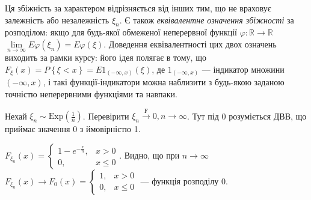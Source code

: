 \begin{enumerate}
    Ця збіжність за характером відрізняється від інших тим, що не враховує залежність або незалежність $\xi_n$.
    Є також \emph{еквівалентне означення збіжності} за розподілом: якщо для будь-якої обмеженої неперервної функції $\varphi : \mathbb{R} \to \mathbb{R}$
    $\underset{n \to \infty}{\lim} E \varphi(\xi_n) = E\varphi(\xi)$.
    Доведення еквівалентності цих двох означень виходить за рамки курсу: його ідея полягає в тому, що $F_{\xi}(x) = P\left\{ \xi < x\right\} = E 1_{(-\infty, x)}(\xi)$,
    де $1_{(-\infty, x)}$ --- індикатор множини $(-\infty, x)$, і такі функції-індикатори можна наблизити з будь-якою заданою точністю неперервними функціями та навпаки.
    \begin{example}
        Нехай $\xi_n \sim \mathrm{Exp}(\frac{1}{n})$. Перевірити $\xi_n \overset{\mathrm{F}}{\to} 0, n \to \infty$.
        Тут під 0 розуміється ДВВ, що приймає значення 0 з ймовірністю 1.

        $F_{\xi_n}(x) = \begin{cases}
            1 - e^{-\frac{x}{n}}, & x > 0 \\
            0, & x \leq 0
        \end{cases}$. Видно, що при $n \to \infty$ $F_{\xi_n}(x) \to F_0(x) = \begin{cases}
            1, & x > 0 \\
            0, & x \leq 0
        \end{cases}
        $ --- функція розподілу 0.
    \end{example}
\end{enumerate}

